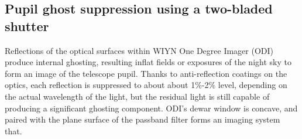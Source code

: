 \documentclass[draft]{spieman}
\begin{document}
\subsection{Pupil ghost suppression using a two-bladed shutter}



Reflections of the optical surfaces within WIYN One Degree Imager (ODI) produce
internal ghosting, resulting inflat fields or exposures of the night sky to form
an image of the telescope pupil. Thanks to anti-reflection coatings on the
optics, each reflection is suppressed to about about 1\%-2\% level, depending on
the actual wavelength of the light, but the residual light is still capable of
producing a significant ghosting component. ODI’s dewar window is concave, and
paired with the plane surface of the passband filter forms an imaging system
that.
\end{document}
